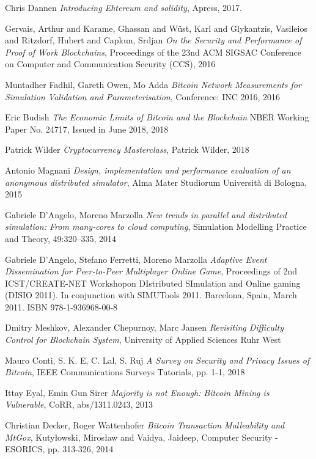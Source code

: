 \begin{thebibliography}{99}
 Chris Dannen
{\em Introducing Ehtereum and solidity},
Apress, 2017.

 Gervais, Arthur and Karame, Ghassan and Wüst, Karl and Glykantzis, Vasileios and Ritzdorf, Hubert and Capkun, Srdjan
{\em On the Security and Performance of Proof of Work Blockchains},
Proceedings of the 23nd ACM SIGSAC Conference on Computer and Communication Security (CCS), 2016

 Muntadher Fadhil, Gareth Owen, Mo Adda
{\em Bitcoin Network Measurements for Simulation Validation and Parameterisation},
Conference: INC 2016, 2016

 Eric Budish
{\em The Economic Limits of Bitcoin and the Blockchain}
NBER Working Paper No. 24717, Issued in June 2018, 2018

 Patrick Wilder
{\em Cryptocurrency Masterclass},
Patrick Wilder, 2018

 Antonio Magnani
{\em Design, implementation and performance evaluation of an anonymous distributed simulator},
Alma Mater Studiorum Università di Bologna, 2015

 Gabriele D'Angelo, Moreno Marzolla
{\em New trends in parallel and distributed simulation: From many-cores to cloud computing},
Simulation Modelling Practice and Theory, 49:320–335, 2014

 Gabriele D'Angelo, Stefano Ferretti, Moreno Marzolla
{\em Adaptive Event Dissemination for Peer-to-Peer Multiplayer Online Game},
Proceedings of 2nd ICST/CREATE-NET Workshopon DIstributed SImulation and Online gaming (DISIO 2011).
In conjunction with SIMUTools 2011. Barcelona, Spain, March 2011. ISBN 978-1-936968-00-8

 Dmitry Meshkov, Alexander Chepurnoy, Marc Jansen
{\em Revisiting Difficulty Control for Blockchain System},
University of Applied Sciences Ruhr West

 Mauro Conti, S. K. E, C. Lal, S. Ruj
{\em A Survey on Security and Privacy Issues of Bitcoin}, 
IEEE Communications Surveys Tutorials, pp. 1-1, 2018

 Ittay Eyal, Emin Gun Sirer
{\em Majority is not Enough: Bitcoin Mining is Vulnerable},
CoRR, abs/1311.0243, 2013

 Christian Decker, Roger Wattenhofer
{\em Bitcoin Transaction Malleability and MtGox},
Kuty{\l}owski, Miros{\l}aw and Vaidya, Jaideep, Computer Security - ESORICS, pp. 313-326, 2014


\end{thebibliography}
